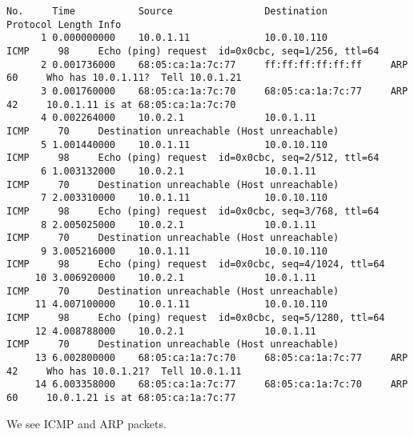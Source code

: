 \begin{lstlisting}
No.     Time           Source                Destination           Protocol Length Info
      1 0.000000000    10.0.1.11             10.0.10.110           ICMP     98     Echo (ping) request  id=0x0cbc, seq=1/256, ttl=64
      2 0.001736000    68:05:ca:1a:7c:77     ff:ff:ff:ff:ff:ff     ARP      60     Who has 10.0.1.11?  Tell 10.0.1.21
      3 0.001760000    68:05:ca:1a:7c:70     68:05:ca:1a:7c:77     ARP      42     10.0.1.11 is at 68:05:ca:1a:7c:70
      4 0.002264000    10.0.2.1              10.0.1.11             ICMP     70     Destination unreachable (Host unreachable)
      5 1.001440000    10.0.1.11             10.0.10.110           ICMP     98     Echo (ping) request  id=0x0cbc, seq=2/512, ttl=64
      6 1.003132000    10.0.2.1              10.0.1.11             ICMP     70     Destination unreachable (Host unreachable)
      7 2.003310000    10.0.1.11             10.0.10.110           ICMP     98     Echo (ping) request  id=0x0cbc, seq=3/768, ttl=64
      8 2.005025000    10.0.2.1              10.0.1.11             ICMP     70     Destination unreachable (Host unreachable)
      9 3.005216000    10.0.1.11             10.0.10.110           ICMP     98     Echo (ping) request  id=0x0cbc, seq=4/1024, ttl=64
     10 3.006920000    10.0.2.1              10.0.1.11             ICMP     70     Destination unreachable (Host unreachable)
     11 4.007100000    10.0.1.11             10.0.10.110           ICMP     98     Echo (ping) request  id=0x0cbc, seq=5/1280, ttl=64
     12 4.008788000    10.0.2.1              10.0.1.11             ICMP     70     Destination unreachable (Host unreachable)
     13 6.002800000    68:05:ca:1a:7c:70     68:05:ca:1a:7c:77     ARP      42     Who has 10.0.1.21?  Tell 10.0.1.11
     14 6.003358000    68:05:ca:1a:7c:77     68:05:ca:1a:7c:70     ARP      60     10.0.1.21 is at 68:05:ca:1a:7c:77
\end{lstlisting}
We see ICMP and ARP packets.